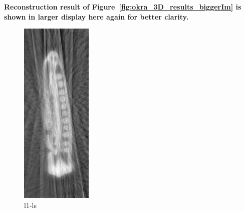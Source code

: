 \documentclass{article}
\begin{document}
\textbf{Reconstruction result of Figure~\ref{fig:okra_3D_results_biggerIm}  is shown in larger display here  again for better clarity.}
\begin{figure}[!h]
\centering
       \includegraphics[width=0.5\columnwidth]{../images/okra/cs_cropped.png}
\captionsetup{labelformat=empty}
        \caption{\large{l1-ls}}
\end{figure}
\newpage
\end{document}
